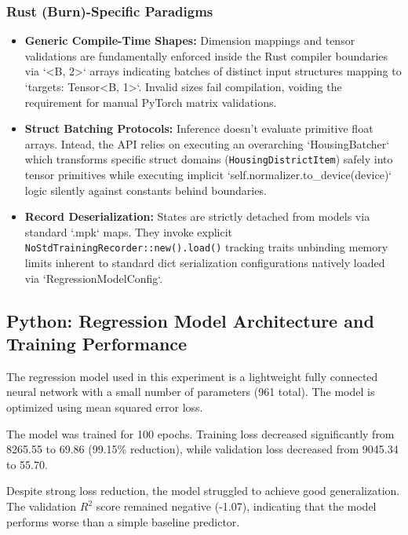 \documentclass[10pt,a4paper,twocolumn]{article}
\begin{document}
\subsubsection{Rust (Burn)-Specific Paradigms}
\begin{itemize}
    \item \textbf{Generic Compile-Time Shapes:} Dimension mappings and tensor validations are fundamentally enforced inside the Rust compiler boundaries via `<B, 2>` arrays indicating batches of distinct input structures mapping to `targets: Tensor<B, 1>`. Invalid sizes fail compilation, voiding the requirement for manual PyTorch matrix validations.
    \item \textbf{Struct Batching Protocols:} Inference doesn't evaluate primitive float arrays. Intead, the API relies on executing an overarching `HousingBatcher` which transforms specific struct domains (\texttt{HousingDistrictItem}) safely into tensor primitives while executing implicit `self.normalizer.to\_device(device)` logic silently against constants behind boundaries.
    \item \textbf{Record Deserialization:} States are strictly detached from models via standard `.mpk` maps. They invoke explicit \texttt{NoStdTrainingRecorder::new().load()} tracking traits unbinding memory limits inherent to standard dict serialization configurations natively loaded via `RegressionModelConfig`.
\end{itemize}

\newpage
\subsection{Python: Regression Model Architecture and Training Performance}

The regression model used in this experiment is a lightweight fully connected neural network with a small number of parameters (961 total). The model is optimized using mean squared error loss.



The model was trained for 100 epochs. Training loss decreased significantly from 8265.55 to 69.86 (99.15\% reduction), while validation loss decreased from 9045.34 to 55.70.

Despite strong loss reduction, the model struggled to achieve good generalization. The validation $R^2$ score remained negative (-1.07), indicating that the model performs worse than a simple baseline predictor.
\end{document}
